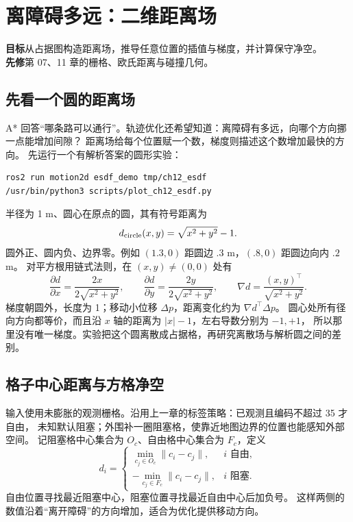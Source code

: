 \chapter{离障碍多远：二维距离场}
\begin{notebox}
\textbf{目标}\quad 从占据图构造距离场，推导任意位置的插值与梯度，并计算保守净空。\\
\textbf{先修}\quad 第 07、11 章的栅格、欧氏距离与碰撞几何。
\end{notebox}

\section{先看一个圆的距离场}
A* 回答“哪条路可以通行”。轨迹优化还希望知道：离障碍有多远，向哪个方向挪一点能增加间隙？
距离场给每个位置赋一个数，梯度则描述这个数增加最快的方向。
先运行一个有解析答案的圆形实验：
\begin{lstlisting}[language=bash]
ros2 run motion2d esdf_demo tmp/ch12_esdf
/usr/bin/python3 scripts/plot_ch12_esdf.py
\end{lstlisting}
半径为 1 m、圆心在原点的圆，其有符号距离为
\begin{equation}
d_{\rm circle}(x,y)=\sqrt{x^2+y^2}-1.
\end{equation}
圆外正、圆内负、边界零。例如 $(1.3,0)$ 距圆边 $.3$ m，$(.8,0)$ 距圆边向内 $.2$ m。
对平方根用链式法则，在 $(x,y)\neq(0,0)$ 处有
\begin{equation}
\frac{\partial d}{\partial x}=\frac{2x}{2\sqrt{x^2+y^2}},\qquad
\frac{\partial d}{\partial y}=\frac{2y}{2\sqrt{x^2+y^2}},\qquad
\nabla d=\frac{(x,y)^\top}{\sqrt{x^2+y^2}}.
\end{equation}
梯度朝圆外，长度为 1；移动小位移 $\Delta p$，距离变化约为 $\nabla d^\top\Delta p$。
圆心处所有径向方向都等价，而且沿 $x$ 轴的距离为 $|x|-1$，左右导数分别为 $-1,+1$，
所以那里没有唯一梯度。实验把这个圆离散成占据格，再研究离散场与解析圆之间的差别。

\section{格子中心距离与方格净空}
输入使用未膨胀的观测栅格。沿用上一章的标签策略：已观测且编码不超过 35 才自由，
未知默认阻塞；外围补一圈阻塞格，使靠近地图边界的位置也能感知外部空间。
记阻塞格中心集合为 $O_c$、自由格中心集合为 $F_c$，定义
\begin{equation}
d_i=\begin{cases}
\min_{c_j\in O_c}\|c_i-c_j\|,&i\text{ 自由},\\
-\min_{c_j\in F_c}\|c_i-c_j\|,&i\text{ 阻塞}.
\end{cases}
\end{equation}
自由位置寻找最近阻塞中心，阻塞位置寻找最近自由中心后加负号。
这样两侧的数值沿着“离开障碍”的方向增加，适合为优化提供移动方向。


